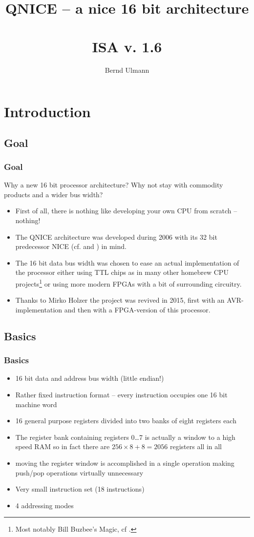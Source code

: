 \documentclass{beamer}
\title{QNICE -- a nice 16 bit architecture\\~\\ISA v. 1.6}
\author{Bernd Ulmann}
\begin{document}
 \begin{frame}
  \titlepage
 \end{frame}
%
 \section{Introduction}
  \subsection{Goal}
   \begin{frame}
    \frametitle{Goal}
    Why a new 16 bit processor architecture? Why not stay with commodity
    products and a wider bus width?
    \begin{itemize}
     \item First of all, there is nothing like developing your own CPU
      from scratch -- nothing!
     \item The QNICE architecture was developed during 2006 with its
      32 bit predecessor NICE (cf. \cite{nice} and \cite{nice_html}) in
      mind. 
     \item The 16 bit data bus width was chosen to ease an actual 
      implementation of the processor either using TTL chips as in many
      other homebrew CPU projects\footnote{Most notably Bill Buzbee's
      Magic, cf \cite{magic}.} or using more modern FPGAs with a bit
      of surrounding circuitry.
     \item Thanks to Mirko Holzer the project was revived in 2015, 
      first with an AVR-implementation and then with a FPGA-version of
      this processor.
    \end{itemize}
   \end{frame}
%
  \subsection{Basics}
   \begin{frame}
    \frametitle{Basics}
    \begin{itemize}
     \item 16 bit data and address bus width (little endian!)
     \item Rather fixed instruction format -- every instruction occupies
      one 16 bit machine word
     \item 16 general purpose registers divided into two banks of eight
      registers each
     \item The register bank containing registers 0\dots 7 is actually
      a window to a high speed RAM so in fact there are $256\times 8+8=2056$ 
      registers all in all
     \item moving the register window is accomplished in a single operation
      making push/pop operations virtually unnecessary
     \item Very small instruction set (18 instructions)
     \item 4 addressing modes
    \end{itemize}
   \end{frame}
%
\end{document}
